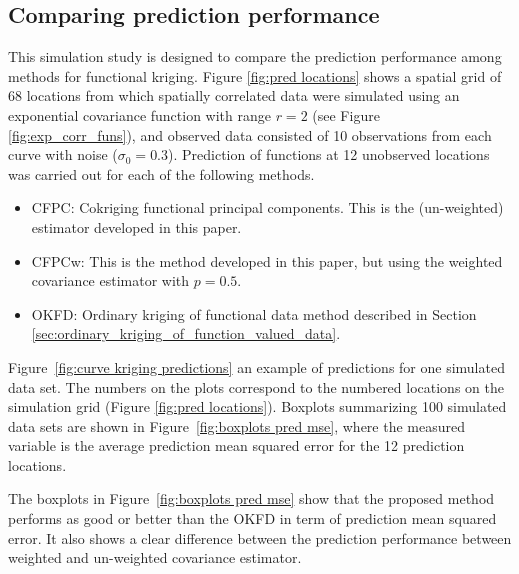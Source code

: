 
\subsection{Comparing prediction performance} %
\label{sub:comparing_prediction_performance}
This simulation study is designed to compare the prediction performance among methods for functional kriging. Figure \ref{fig:pred locations} shows a spatial grid of 68 locations from which spatially correlated data were simulated using an exponential covariance function with range $r = 2$ (see Figure \ref{fig:exp_corr_funs}), and observed data consisted of 10 observations from each curve with noise ($\sigma_0=0.3$). Prediction of functions at 12 unobserved locations was carried out for each of the following methods.
\begin{itemize}
	\item CFPC: Cokriging functional principal components. This is the (un-weighted) estimator developed in this paper.
	\item CFPCw: This is the method developed in this paper, but using the weighted covariance estimator with $p=0.5$.
	\item OKFD: Ordinary kriging of functional data method described in Section \ref{sec:ordinary_kriging_of_function_valued_data}.
\end{itemize}
Figure~\ref{fig:curve kriging predictions} an example of predictions for one simulated data set. The numbers on the plots correspond to the numbered locations on the simulation grid (Figure \ref{fig:pred locations}). Boxplots summarizing 100 simulated data sets are shown in Figure~\ref{fig:boxplots pred mse}, where the measured variable is the average prediction mean squared error for the 12 prediction locations. 

The boxplots in Figure~\ref{fig:boxplots pred mse} show that the proposed method performs as good or better than the OKFD in term of prediction mean squared error. It also shows a clear difference between the prediction performance between weighted and un-weighted covariance estimator. 
 

